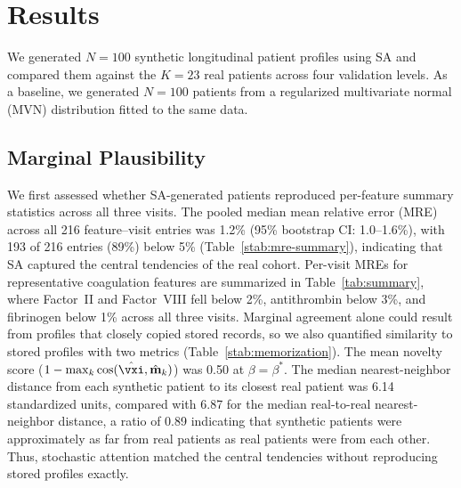 \section{Results}
\label{sec:results}

We generated $N{=}100$ synthetic longitudinal patient profiles using SA and compared
them against the $K{=}23$ real patients across four validation levels. As a baseline, we generated
$N{=}100$ patients from a regularized multivariate normal (MVN) distribution fitted
to the same data.

\subsection{Marginal Plausibility}
\label{sec:results-l1}

We first assessed whether SA-generated patients reproduced per-feature summary
statistics across all three visits. The pooled median mean relative error
(MRE) across all 216 feature--visit entries was 1.2\% (95\% bootstrap CI:
1.0--1.6\%), with 193 of 216 entries (89\%) below 5\%
(Table~\ref{stab:mre-summary}), indicating that SA captured the central
tendencies of the real cohort. Per-visit MREs for representative
coagulation features are summarized in Table~\ref{tab:summary}, where
Factor~II and Factor~VIII fell below 2\%, antithrombin below 3\%, and
fibrinogen below 1\% across all three visits. Marginal agreement alone could result from
profiles that closely copied stored records, so we also quantified similarity to stored
profiles with two metrics (Table~\ref{stab:memorization}). The mean novelty score
($1 - \max_k \cos(\hat{\vxi}, \hat{\mathbf{m}}_k)$) was 0.50 at
$\beta = \beta^*$. The median
nearest-neighbor distance from each synthetic patient to its closest real
patient was 6.14 standardized units, compared with 6.87 for the median
real-to-real nearest-neighbor distance, a ratio of 0.89 indicating that
synthetic patients were approximately as far from real patients as real
patients were from each other. Thus, stochastic attention matched the central tendencies
without reproducing stored profiles exactly.

